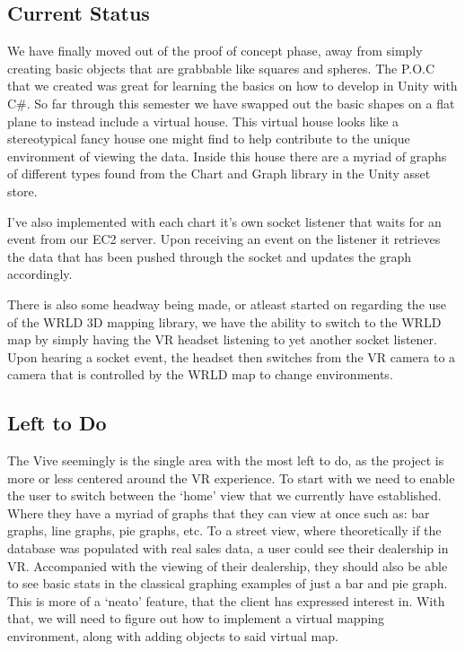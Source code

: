 \documentclass[onecolumn, draftclsnofoot,10pt, compsoc]{IEEEtran}
\begin{document}
    \subsection{Current Status}
    We have finally moved out of the proof of concept phase, away from simply creating basic objects that are grabbable like squares and spheres. The P.O.C that we created was great for learning the basics on how to develop in Unity with C\#. So far through this semester we have swapped out the basic shapes on a flat plane to instead include a virtual house. This virtual house looks like a stereotypical fancy house one might find to help contribute to the unique environment of viewing the data. Inside this house there are a myriad of graphs of different types found from the Chart and Graph library in the Unity asset store.

    I’ve also implemented with each chart it’s own socket listener that waits for an event from our EC2 server. Upon receiving an event on the listener it retrieves the data that has been pushed through the socket and updates the graph accordingly.

    There is also some headway being made, or atleast started on regarding the use of the WRLD 3D mapping library, we have the ability to switch to the WRLD map by simply having the VR headset listening to yet another socket listener. Upon hearing a socket event, the headset then switches from the VR camera to a camera that is controlled by the WRLD map to change environments.

    \subsection{Left to Do}
    The Vive seemingly is the single area with the most left to do, as the project is more or less centered around the VR experience. To start with we need to enable the user to switch between the ‘home’ view that we currently have established. Where they have a myriad of graphs that they can view at once such as: bar graphs, line graphs, pie graphs, etc. To a street view, where theoretically if the database was populated with real sales data, a user could see their dealership in VR. Accompanied with the viewing of their dealership, they should also be able to see basic stats in the classical graphing examples of just a bar and pie graph. This is more of a ‘neato’ feature, that the client has expressed interest in. With that, we will need to figure out how to implement a virtual mapping environment, along with adding objects to said virtual map.
\end{document}
